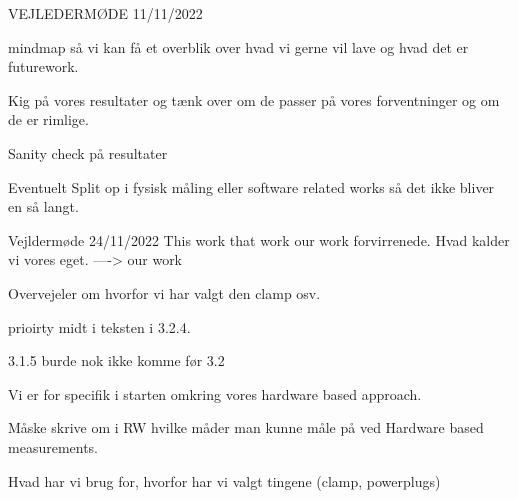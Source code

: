 

VEJLEDERMØDE 11/11/2022

mindmap så vi kan få et overblik over hvad vi gerne vil lave og hvad det er futurework.

Kig på vores resultater og tænk over om de passer på vores forventninger og om de er rimlige. 

Sanity check på resultater

Eventuelt Split op i fysisk måling eller software related works så det ikke bliver en så langt.

Vejldermøde 24/11/2022
This work that work our work forvirrenede. Hvad kalder vi vores eget.
----> our work

Overvejeler om hvorfor vi har valgt den clamp osv.

prioirty midt i teksten i 3.2.4.

3.1.5 burde nok ikke komme før 3.2

Vi er for specifik i starten omkring vores hardware based approach.

Måske skrive om i RW hvilke måder man kunne måle på ved Hardware based measurements.

Hvad har vi brug for, hvorfor har vi valgt tingene (clamp, powerplugs)


